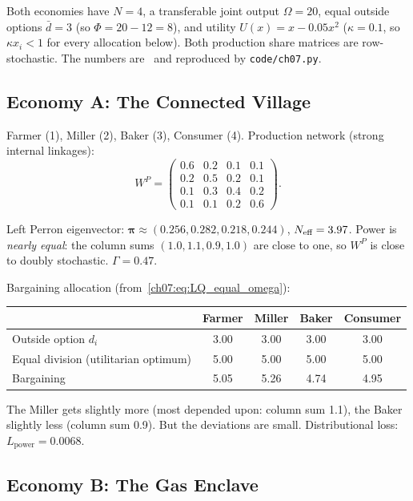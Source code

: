\documentclass[../structural_economics_book.tex]{subfiles}
\begin{document}
Both economies have $N = 4$, a transferable joint output $\Omega = 20$, equal outside options $\bar{d} = 3$ (so $\Phi = 20 - 12 = 8$), and utility $U(x) = x - 0.05x^2$ ($\kappa = 0.1$, so $\kappa x_i < 1$ for every allocation below). Both production share matrices are row-stochastic. The numbers are \illustrative\ and reproduced by \texttt{code/ch07.py}.

\subsection{Economy A: The Connected Village}

Farmer (1), Miller (2), Baker (3), Consumer (4). Production network (strong internal linkages):
\begin{equation}
W^P = \begin{pmatrix} 0.6 & 0.2 & 0.1 & 0.1 \\ 0.2 & 0.5 & 0.2 & 0.1 \\ 0.1 & 0.3 & 0.4 & 0.2 \\ 0.1 & 0.1 & 0.2 & 0.6 \end{pmatrix}.
\end{equation}

Left Perron eigenvector: $\boldsymbol{\pi} \approx (0.256, 0.282, 0.218, 0.244)$, $N_{\text{eff}} = 3.97$. Power is \textit{nearly equal}: the column sums $(1.0, 1.1, 0.9, 1.0)$ are close to one, so $W^P$ is close to doubly stochastic. $\Gamma = 0.47$.

Bargaining allocation (from~\eqref{ch07:eq:LQ_equal_omega}):
\begin{center}
\begin{tabular}{lcccc}
\toprule
& Farmer & Miller & Baker & Consumer \\
\midrule
Outside option $d_i$ & 3.00 & 3.00 & 3.00 & 3.00 \\
Equal division (utilitarian optimum) & 5.00 & 5.00 & 5.00 & 5.00 \\
Bargaining & 5.05 & 5.26 & 4.74 & 4.95 \\
\bottomrule
\end{tabular}
\end{center}

The Miller gets slightly more (most depended upon: column sum 1.1), the Baker slightly less (column sum 0.9). But the deviations are small. Distributional loss: $L_{\text{power}} = 0.0068$.


\subsection{Economy B: The Gas Enclave}
\end{document}
